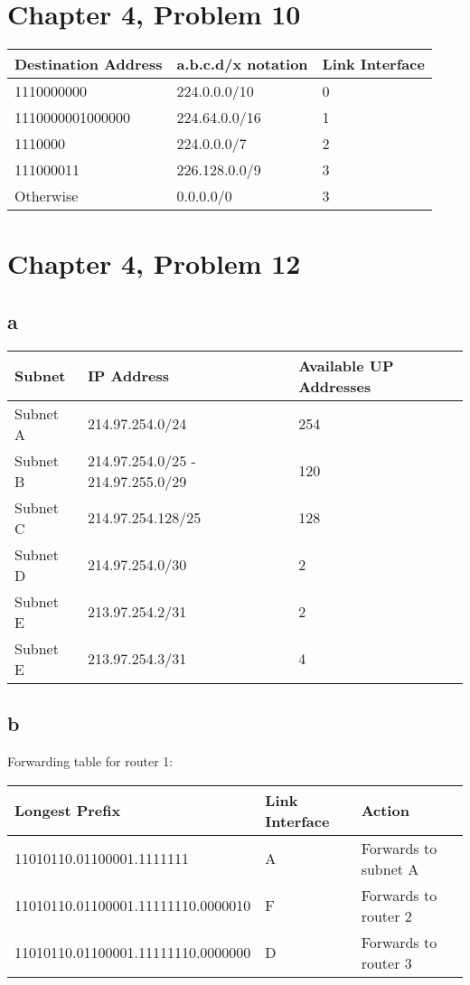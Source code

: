 \documentclass{article}
\begin{document}
\section*{Chapter 4, Problem 10}
\begin{tabular}{ |l|l|l| }
  \hline
  Destination Address & a.b.c.d/x notation & Link Interface\\ \hline
   1110000000 & 224.0.0.0/10 & 0 \\ \hline
   1110000001000000 & 224.64.0.0/16 & 1\\ \hline
   1110000 & 224.0.0.0/7 & 2\\ \hline
   111000011 & 226.128.0.0/9 & 3\\ \hline
   Otherwise & 0.0.0.0/0 & 3\\ \hline
\end{tabular}

\section*{Chapter 4, Problem 12}
\subsection*{a}
\begin{tabular}{ |l|l|l| }
  \hline
  Subnet & IP Address & Available UP Addresses\\ \hline
    Subnet A & 214.97.254.0/24 & 254 \\ \hline
    Subnet B & 214.97.254.0/25 - 214.97.255.0/29 & 120 \\ \hline
    Subnet C & 214.97.254.128/25 & 128 \\ \hline
    Subnet D & 214.97.254.0/30 & 2 \\ \hline
    Subnet E & 213.97.254.2/31 & 2 \\ \hline
    Subnet E & 213.97.254.3/31 & 4 \\ \hline
\end{tabular}

\subsection*{b}
Forwarding table for router 1:\\
\begin{tabular}{ |l|l|l| }
  \hline
  Longest Prefix & Link Interface & Action \\ \hline
     11010110.01100001.1111111 & A & Forwards to subnet A \\ \hline
     11010110.01100001.11111110.0000010 & F & Forwards to router 2\\ \hline
     11010110.01100001.11111110.0000000 & D & Forwards to router 3\\ \hline
\end{tabular}
\end{document}
